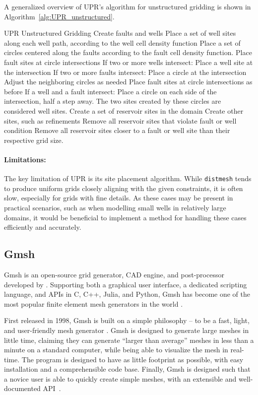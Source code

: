 A generalized overview of UPR's algorithm for unstructured gridding \cite[pp.51]{UPR_thesis} is shown in Algorithm~\ref{alg:UPR_unstructured}.
\begin{pseudocode}[float=ht,label=alg:UPR_unstructured]{UPR Unstructured Gridding}
Create faults and wells
    Place a set of well sites along each well path, according to the well cell density function
    Place a set of circles centered along the faults according to the fault cell density function. Place fault sites at circle intersections
    If two or more wells intersect:
        Place a well site at the intersection
    If two or more faults intersect:
        Place a circle at the intersection
        Adjust the neighboring circles as needed
        Place fault sites at circle intersections as before
    If a well and a fault intersect:
        Place a circle on each side of the intersection, half a step away. The two sites created by these circles are considered well sites.
Create a set of reservoir sites in the domain
Create other sites, such as refinements
Remove all reservoir sites that violate fault or well condition
Remove all reservoir sites closer to a fault or well site than their respective grid size.
\end{pseudocode}

\paragraph{Limitations:}
The key limitation of UPR is its site placement algorithm. While \verb|distmesh| tends to produce uniform grids closely aligning with the given constraints, it is often slow, especially for grids with fine details. As these cases may be present in practical scenarios, such as when modelling small wells in relatively large domains, it would be beneficial to implement a method for handling these cases efficiently and accurately.


\subsection{Gmsh}
\label{sec:Gmsh}
Gmsh is an open-source grid generator, CAD engine, and post-processor developed by \textcite{Gmsh_article}. Supporting both a graphical user interface, a dedicated scripting language, and APIs in C, C++, Julia, and Python, Gmsh has become one of the most popular finite element mesh generators in the world \cite{Gmsh_presentation}.

First released in 1998, Gmsh is built on a simple philosophy -- to be a fast, light, and user-friendly mesh generator \cite{Gmsh_article}. Gmsh is designed to generate large meshes in little time, claiming they can generate ``larger than average'' meshes in less than a minute on a standard computer, while being able to visualize the mesh in real-time. The program is designed to have as little footprint as possible, with easy installation and a comprehensible code base. Finally, Gmsh is designed such that a novice user is able to quickly create simple meshes, with an extensible and well-documented API~\cite{Gmsh_presentation}.

